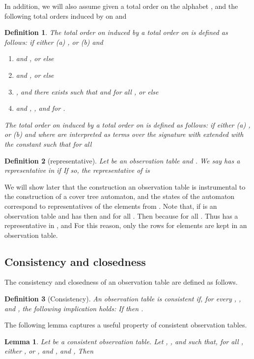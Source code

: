 \documentclass[preprint,12pt,english]{article}
\newcommand\comment[1]{}
\newtheorem{definition}{Definition}
\newtheorem{lemma}{Lemma}
\begin{document}
In addition, we will also assume given a total order  on the alphabet , and the following total orders induced by  on  and 
\begin{definition}
\label{def1}
The total order  on  induced by a total order  on  is defined as follows:  if either (a) , or (b)  and
\begin{enumerate}
\item  and , or else
\item  and , or else
\item ,  and there exists  such that  and  for all , or else
\item  and , , and  for .
\end{enumerate}
The total order  on  induced by a total order  on  is defined as follows:
 if either (a) , or (b)  and  where  are interpreted as terms over the signature with  extended with the constant  such that  for all 
\end{definition}
\begin{definition}[representative]
Let  be an observation table and . We say  \emph{has a representative} in  if  If so, the \emph{representative} of   is 
\end{definition}
We will show later that the construction an observation table  is instrumental to the construction of a cover tree automaton,  and the states of the automaton correspond to representatives of the elements from .
Note that, if  is an observation table and  has  then  and  for all . Then  because  for all . Thus  has a representative in , and  For this reason, only the rows for elements  are kept in an observation table. 
\subsection{Consistency and closedness}
\comment{
Using this definition, we choose the representative  of  in a closed observation table  to be the minimum element of the set  Note that  when  is closed,  thus  is well defined for all . Also, if  has  then  for all , and thus  is the minimum element of . For this reason, we we do not need to keep a row for elements   in the observation table because  is known a priori.
}

The   consistency and closedness of an observation table are defined as follows.
\begin{definition}[Consistency]
An observation table  is consistent if, for every , , and , the following implication holds:
If  then . 
\end{definition}
The following lemma captures a useful property of consistent observation tables.
\begin{lemma}
\label{lele}
Let  be a consistent observation table. Let , , and  such that, for all , either 
, or 
,  and ,
and ,  Then 
\end{lemma}
\end{document}
